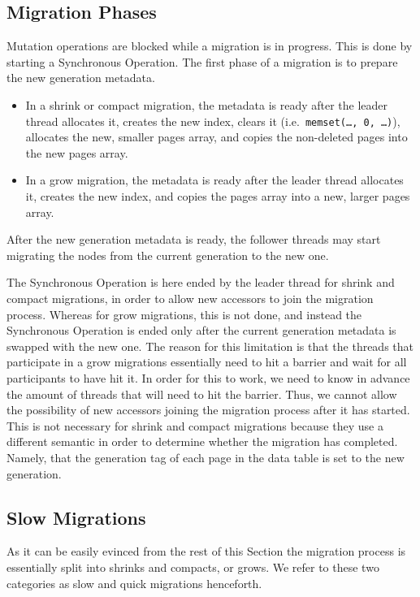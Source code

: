 \subsection{Migration Phases}\label{subsec:migration-phases}


Mutation operations are blocked while a migration is in progress.
This is done by starting a Synchronous Operation.
The first phase of a migration is to prepare the new generation metadata.
\begin{itemize}
    \item In a shrink or compact migration, the metadata is ready after the leader thread allocates it, creates the new index, clears it (i.e.\ \texttt{memset(\ldots, 0, \ldots)}), allocates the new, smaller pages array, and copies the non-deleted pages into the new pages array.
    \item In a grow migration, the metadata is ready after the leader thread allocates it, creates the new index, and copies the pages array into a new, larger pages array.
\end{itemize}
After the new generation metadata is ready, the follower threads may start migrating the nodes from the current generation to the new one.

The Synchronous Operation is here ended by the leader thread for shrink and compact migrations, in order to allow new accessors to join the migration process.
Whereas for grow migrations, this is not done, and instead the Synchronous Operation is ended only after the current generation metadata is swapped with the new one.
The reason for this limitation is that the threads that participate in a grow migrations essentially need to hit a barrier and wait for all participants to have hit it.
In order for this to work, we need to know in advance the amount of threads that will need to hit the barrier.
Thus, we cannot allow the possibility of new accessors joining the migration process after it has started.
This is not necessary for shrink and compact migrations because they use a different semantic in order to determine whether the migration has completed.
Namely, that the generation tag of each page in the data table is set to the new generation.

\subsection{Slow Migrations}\label{subsec:slow-migrations}

As it can be easily evinced from the rest of this Section the migration process is essentially split into shrinks and compacts, or grows.
We refer to these two categories as slow and quick migrations henceforth.

